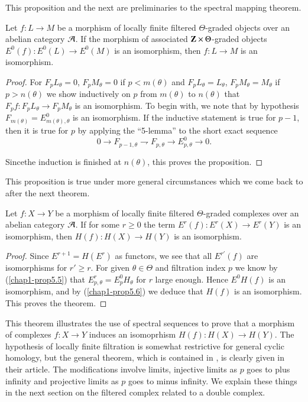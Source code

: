 This proposition and the next are preliminaries to the spectral
mapping theorem.

\begin{proposition}\label{chap1-prop5.6}
Let $f:L\to M$ be a morphism of locally finite filtered
$\Theta$-graded objects over an abelian category $\mathcal{A}$. If the morphism
of associated $\mathbf{Z}\times \Theta$-graded objects $E^{0}(f):E^{0}(L)\to
E^{0}(M)$ is an isomorphism, then $f:L\to M$ is an isomorphism.
\end{proposition}

\begin{proof}
For $F_{p}L_{\theta}=0$, $F_{p}M_{\theta}=0$ if $p<m(\theta)$ and
$F_{p}L_{\theta}=L_{\theta}$, $F_{p}M_{\theta}=M_{\theta}$ if
$p>n(\theta)$ we show inductively on $p$ from $m(\theta)$ to
$n(\theta)$ that $F_{p}f:F_{p}L_{\theta}\to F_{p}M_{\theta}$ is an
isomorphism. To begin with, we note that by hypothesis
$F_{m(\theta)}=E^{0}_{m(\theta),\theta}$ is an isomorphism. If the
inductive statement is true for $p-1$, then it is true for $p$ by
applying the ``5-lemma'' to the short exact sequence
$$
0\to F_{p-1,\theta}\rightharpoondown F_{p,\theta}\to
E^{0}_{p,\theta}\to 0.
$$

Since\pageoriginale the induction is finished at $n(\theta)$, this
proves the proposition.
\end{proof}

This proposition is true under more general circumstances which we
come back to after the next theorem.

\begin{theorem}\label{chap1-thm5.7}
Let $f:X\to Y$ be a morphism of locally finite filtered
$\Theta$-graded complexes over an abelian category $\mathcal{A}$. If for some
$r\geq 0$ the term $E^{r}(f):E^{r}(X)\to E^{r}(Y)$ is an isomorphism,
then $H(f):H(X)\to H(Y)$ is an isomorphism.
\end{theorem}

\begin{proof}
Since $E^{r+1}=H(E^{r})$ as functors, we see that all $E^{r'}(f)$ are
isomorphisms for $r'\geq r$. For given $\theta\in \Theta$ and
filtration index $p$ we know by (\ref{chap1-prop5.5}) that
$E^{r}_{p,\theta}=E^{0}_{p}H_{\theta}$ for $r$ large enough. Hence
$E^{0}H(f)$ is an isomorphism, and by (\ref{chap1-prop5.6}) we deduce
that $H(f)$ is an isomorphism. This proves the theorem.
\end{proof}

This theorem illustrates the use of spectral sequences to prove that a
morphism of complexes $f:X\to Y$ induces an isomoprhism $H(f):H(X)\to
H(Y)$. The hypothesis of locally finite filtration is somewhat
restrictive for general cyclic homology, but the general theorem,
which is contained in \cite{Eilenberg1962}, is clearly given in
their article. The modifications involve limits, injective limits as
$p$ goes to plus infinity and projective limits as $p$ goes to minus
infinity. We explain these things in the next section on the filtered
complex related to a double complex. 

